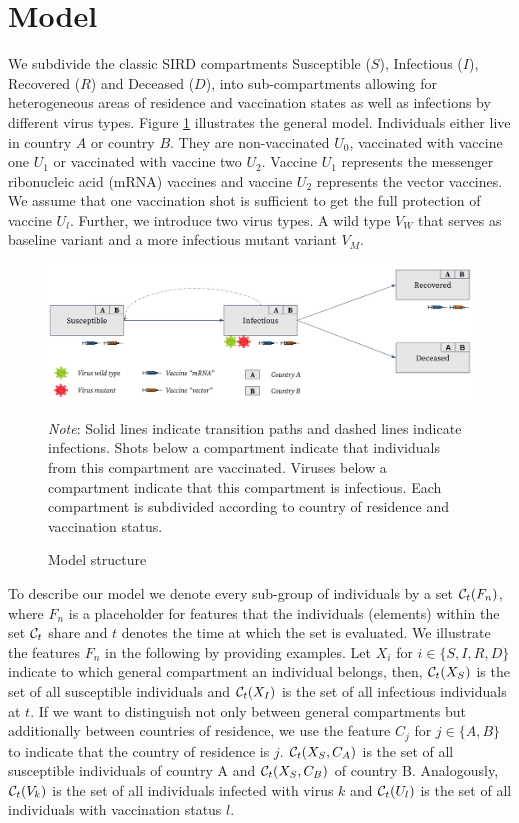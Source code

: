 \section{Model}
\label{sec:model}
We subdivide the classic SIRD compartments Susceptible ($S$), Infectious ($I$), Recovered ($R$) and Deceased ($D$), into sub-compartments allowing for heterogeneous areas of residence and vaccination states as well as infections by different virus types. Figure \ref{fig:model} illustrates the general model. Individuals either live in country $A$ or country $B$. They are non-vaccinated $U_0$, vaccinated with vaccine one $U_1$ or vaccinated with vaccine two $U_2$. Vaccine $U_1$ represents the messenger ribonucleic acid (mRNA) vaccines and vaccine $U_2$ represents the vector vaccines. We assume that one vaccination shot is sufficient to get the full protection of vaccine $U_l$. Further, we introduce two virus types. A wild type $V_W$ that serves as baseline variant and a more infectious mutant variant $V_M$.\\
\begin{figure}[h!]
\centering
\includegraphics[scale=0.3]{images/vaccination_pp_blue_orange.png}\\
\begin{flushleft}
\scriptsize{\textit{Note}: Solid lines indicate transition paths and dashed lines indicate infections. Shots below a compartment indicate that individuals from this compartment are vaccinated. Viruses below a compartment indicate that this compartment is infectious. Each compartment is subdivided according to country of residence and vaccination status.}
\end{flushleft}
\caption{Model structure}
\label{fig:model}
\end{figure}

To describe our model we denote every sub-group of individuals by a set $\mathcal{C}_t(F_n)$, where $F_n$ is a placeholder for features that the individuals (elements) within the set $\mathcal{C}_t$ share and $t$ denotes the time at which the set is evaluated. We illustrate the features $F_n$ in the following by providing examples. Let $X_i$ for $i \in \{S, I, R, D \}$ indicate to which general compartment an individual belongs, then, $\mathcal{C}_t(X_S)$ is the set of all susceptible individuals and $\mathcal{C}_t(X_I)$ is the set of all infectious individuals at $t$. If we want to distinguish not only between general compartments but additionally between countries of residence, we use the feature $C_j$ for $j \in \{A, B\}$ to indicate that the country of residence is $j$. $\mathcal{C}_t(X_S, C_A)$ is the set of all susceptible individuals of country A and $\mathcal{C}_t(X_S, C_B)$ of country B. Analogously, $\mathcal{C}_t(V_k)$ is the set of all individuals infected with virus $k$ and $\mathcal{C}_t(U_l)$ is the set of all individuals with vaccination status $l$.\\

